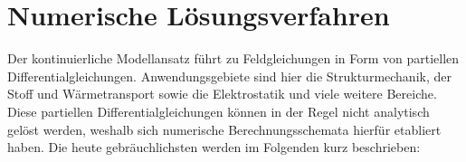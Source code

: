 \documentclass[letterpaper,10pt,german]{jupyterBook}
\begin{document}
\sphinxstepscope


\section{Numerische Lösungsverfahren}
\label{\detokenize{chapters/chapter1/Einf_xfchrung_Loesungsverfahren:numerische-losungsverfahren}}\label{\detokenize{chapters/chapter1/Einf_xfchrung_Loesungsverfahren::doc}}
\sphinxAtStartPar
Der kontinuierliche Modellansatz führt zu Feldgleichungen in Form von partiellen Differentialgleichungen. Anwendungsgebiete sind hier die Strukturmechanik, der Stoff\sphinxhyphen{} und Wärmetransport sowie die Elektrostatik und viele weitere Bereiche. Diese partiellen Differentialgleichungen können in der Regel nicht analytisch gelöst werden, weshalb sich numerische Berechnungsschemata hierfür etabliert haben. Die heute gebräuchlichsten werden im Folgenden kurz beschrieben:
\end{document}
